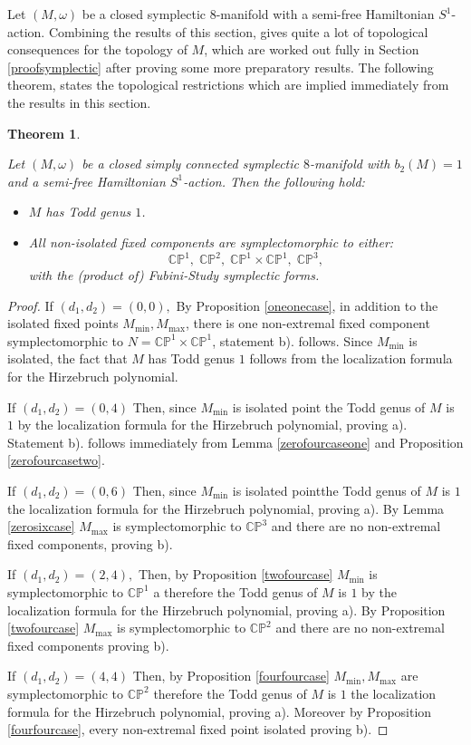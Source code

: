 \documentclass[12pt]{article}
\newtheorem{theorem}{Theorem}[section]
\begin{document}
Let $(M,\omega)$ be a closed symplectic $8$-manifold with a semi-free Hamiltonian $S^1$-action. Combining the results of this section, gives quite a lot of topological consequences for the topology of $M$, which are worked out fully in Section \ref{proofsymplectic} after proving some more preparatory results. The following theorem, states the topological restrictions which are implied immediately from the results in this section.


\begin{theorem} \label{intermediate}

 
Let $(M,\omega)$ be a closed simply connected symplectic $8$-manifold with $b_{2}(M)=1$ and a semi-free Hamiltonian $S^1$-action. Then the following hold:
\begin{itemize}
\item[a).] $M$  has Todd genus $1$.
\item[b).] All non-isolated fixed  components are symplectomorphic to either: $$ \mathbb{CP}^1,\;\mathbb{CP}^2, \; \mathbb{CP}^1 \times \mathbb{CP}^1,\; \mathbb{CP}^3,$$ with the (product of) Fubini-Study symplectic forms.
\end{itemize}
\end{theorem}
\begin{proof}

If $(d_1,d_2) = (0,0),$ By Proposition \ref{oneonecase}, in addition to the isolated fixed points $M_{\min},M_{\max}$, there is one non-extremal fixed component symplectomorphic to $N=\mathbb{CP}^1 \times \mathbb{CP}^1$, statement b). follows. Since $M_{\min}$ is isolated, the fact that $M$ has Todd genus $1$ follows from the localization formula for the Hirzebruch polynomial. 

If $(d_1,d_2) = (0,4)$ Then, since $M_{\min}$ is isolated point the Todd genus of $M$ is $1$ by the localization formula for the Hirzebruch polynomial, proving a). Statement b).  follows immediately from Lemma \ref{zerofourcaseone} and Proposition \ref{zerofourcasetwo}. 

If $(d_1,d_2) = (0,6)$ Then, since $M_{\min}$ is isolated pointthe Todd genus of $M$ is $1$ the localization formula for the Hirzebruch polynomial, proving a). By Lemma \ref{zerosixcase} $M_{\max}$ is symplectomorphic to $\mathbb{CP}^3$ and there are no non-extremal fixed components, proving b).


If $(d_1,d_2) =(2,4),$ Then, by Proposition \ref{twofourcase} $M_{\min}$ is symplectomorphic to $\mathbb{CP}^1$ a therefore the Todd genus of $M$ is $1$ by the localization formula for the Hirzebruch polynomial, proving a).  By Proposition  \ref{twofourcase}  $M_{\max}$ is symplectomorphic to $\mathbb{CP}^2$  and there are no non-extremal fixed components proving b).



If  $(d_1,d_2) =(4,4)$ Then, by Proposition \ref{fourfourcase} $M_{\min},M_{\max}$ are symplectomorphic to $\mathbb{CP}^2$  therefore  the Todd genus of $M$ is $1$ the localization formula for the Hirzebruch polynomial, proving a). Moreover by Proposition \ref{fourfourcase}, every non-extremal fixed point isolated proving b). 
\end{proof}
\end{document}
